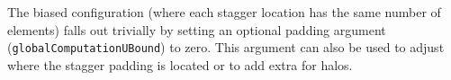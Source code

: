 The biased configuration (where each stagger location has the same number of elements) falls out trivially by setting an optional padding argument ({\tt globalComputationUBound}) to zero. This argument can also be used to adjust where the stagger padding is located or
to add extra for halos. 



